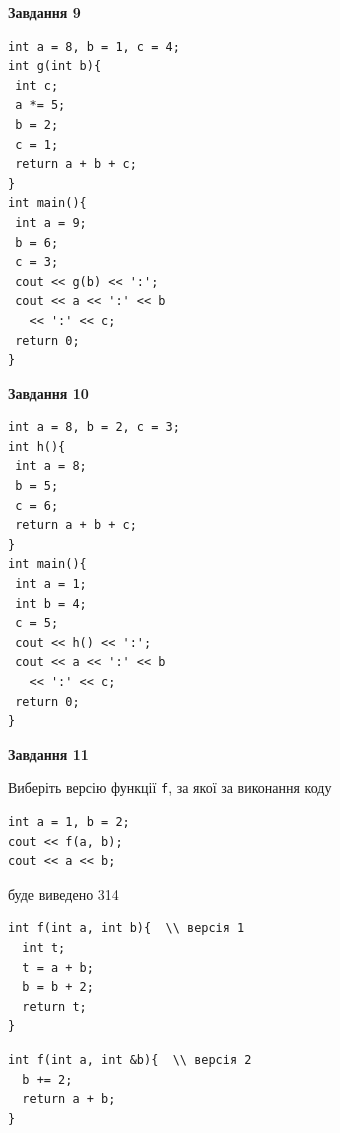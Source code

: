 \documentclass[12pt, ukrainian]{article}
\def\code#1{\Verb!#1!}
\begin{document}
{\begin {large}
\begin{minipage}[t]{11.0cm}
\end{minipage}


\begin{minipage}[t]{7.0cm}

\begin{center}
\textbf{Завдання 9}
\end{center}
\vspace{-8mm}

\begin{verbatim}
int a = 8, b = 1, c = 4;
int g(int b){
 int c;
 a *= 5;
 b = 2;
 c = 1;
 return a + b + c;
}
int main(){
 int a = 9;
 b = 6;
 c = 3;
 cout << g(b) << ':';
 cout << a << ':' << b 
   << ':' << c;
 return 0;
}
\end{verbatim}



\begin{center}
\textbf{Завдання 10}
\end{center}
\vspace{-8mm}

\begin{verbatim}
int a = 8, b = 2, c = 3;
int h(){
 int a = 8;
 b = 5;
 c = 6;
 return a + b + c;
}
int main(){
 int a = 1;
 int b = 4;
 c = 5;
 cout << h() << ':';
 cout << a << ':' << b 
   << ':' << c;
 return 0;
}
\end{verbatim}

\end{minipage}
\vline \hspace{1mm}
\begin{minipage}[t]{11.0cm}

\begin{center}
\textbf{Завдання 11}
\end{center}
Виберіть версію функції \code{f}, за якої за виконання коду
\begin{verbatim}
int a = 1, b = 2;
cout << f(a, b);
cout << a << b;
\end{verbatim}

буде виведено 314

\begin{verbatim}
int f(int a, int b){  \\ версія 1
  int t;
  t = a + b;
  b = b + 2;
  return t;
}
\end{verbatim}

\vspace{-8mm}\begin{verbatim}
int f(int a, int &b){  \\ версія 2
  b += 2;
  return a + b;
}
\end{verbatim}


\end{minipage}
\end{large}}
\end{document}
